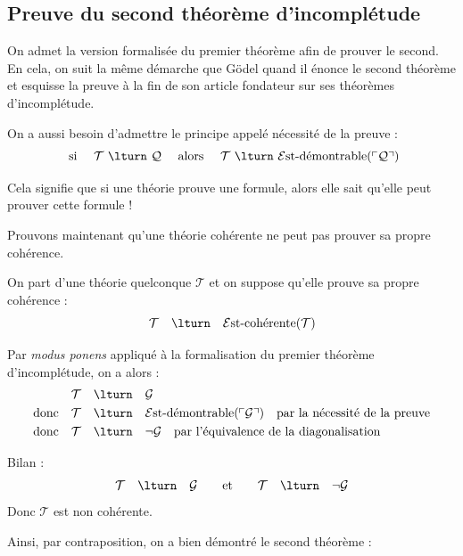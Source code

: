 \documentclass[11pt,class=report,crop=false]{standalone}
\begin{document}
\subsection{Preuve du second théorème d'incomplétude}

On admet la version formalisée du premier théorème afin de prouver le second.
En cela, on suit la même démarche que Gödel quand il énonce le second théorème et esquisse la preuve à la fin de son article fondateur sur ses théorèmes d'incomplétude.


On a aussi besoin d'admettre le principe appelé \og{}nécessité de la preuve\fg{} :
\[
\text{ si } \quad \mathcal{T} \ \lturn \ \mathcal{Q} \quad \text{ alors } \quad  \mathcal{T} \ \lturn \ \mathcal{E}\text{st-démontrable}(\ulcorner \mathcal{Q} \urcorner)
\] 

Cela signifie que si une théorie prouve une formule, alors elle sait qu'elle peut prouver cette formule !

\bigskip

Prouvons maintenant qu'une théorie cohérente ne peut pas prouver sa propre cohérence.

On part d'une théorie quelconque $\mathcal{T}$ et on suppose qu'elle prouve sa propre cohérence : 
\[  \mathcal{T} \quad \lturn \quad \mathcal{E}\text{st-cohérente}(\mathcal{T}) \]

Par \emph{modus ponens} appliqué à la formalisation du premier théorème d'incomplétude, on a alors :
\begin{align*}
    & \mathcal{T} \quad \lturn \quad \mathcal{G} \\
    \text{donc} \quad & \mathcal{T} \quad \lturn \quad \mathcal{E}\text{st-démontrable}(\ulcorner \mathcal{G} \urcorner) \quad \text{par la nécessité de la preuve} \\
    \text{donc} \quad & \mathcal{T} \quad \lturn \quad \lnot \mathcal{G} \quad \text{par l'équivalence de la diagonalisation}
\end{align*}

Bilan :
\[ 
\mathcal{T} \quad \lturn \quad \mathcal{G} \qquad \text{et} \qquad \mathcal{T} \quad \lturn \quad \lnot \mathcal{G} \]
Donc $\mathcal{T}$ est non cohérente.

\medskip

Ainsi, par contraposition, on a bien démontré le second théorème : 

\end{document}
